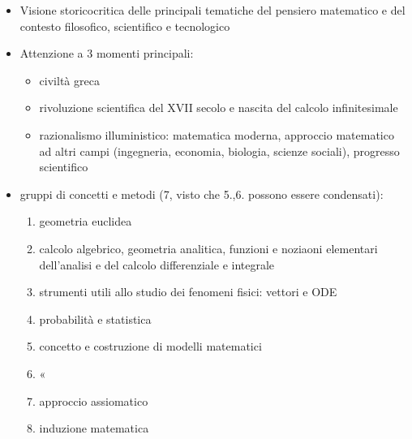 \documentclass[letterpaper,10pt,italian]{jupyterBook}
\begin{document}
\label{\detokenize{ch/school-programs/current-guidelines-italy:linee-generali-e-competenze}}\begin{itemize}
\item {} 
\sphinxAtStartPar
Visione storico\sphinxhyphen{}critica delle principali tematiche del pensiero matematico e del contesto filosofico, scientifico e tecnologico

\item {} 
\sphinxAtStartPar
Attenzione a 3 momenti principali:
\begin{itemize}
\item {} 
\sphinxAtStartPar
civiltà greca

\item {} 
\sphinxAtStartPar
rivoluzione scientifica del XVII secolo e nascita del calcolo infinitesimale

\item {} 
\sphinxAtStartPar
razionalismo illuministico: matematica moderna, approccio matematico ad altri campi (ingegneria, economia, biologia, scienze sociali), progresso scientifico

\end{itemize}

\item {} 
 gruppi di concetti e metodi (7, visto che 5.,6. possono essere condensati):
\begin{enumerate}
%
\item {} 
\sphinxAtStartPar
geometria euclidea

\item {} 
\sphinxAtStartPar
calcolo algebrico, geometria analitica, funzioni e noziaoni elementari dell’analisi e del calcolo differenziale e integrale

\item {} 
\sphinxAtStartPar
strumenti utili allo studio dei fenomeni fisici: vettori e ODE

\item {} 
\sphinxAtStartPar
probabilità e statistica

\item {} 
\sphinxAtStartPar
concetto e costruzione di modelli matematici

\item {} 
\sphinxAtStartPar
«

\item {} 
\sphinxAtStartPar
approccio assiomatico

\item {} 
\sphinxAtStartPar
induzione matematica

\end{enumerate}

\end{itemize}
\end{document}
